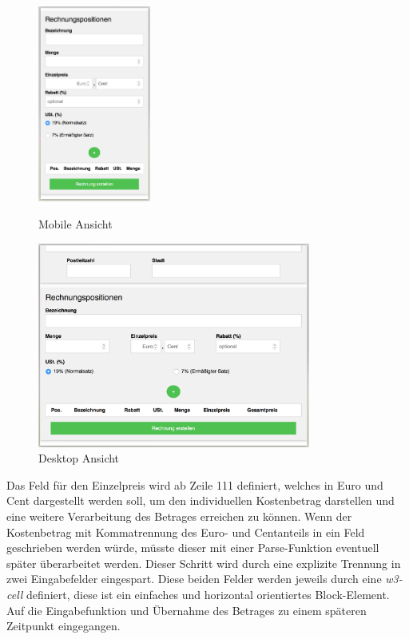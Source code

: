 \begin{figure}[H]
    \centering
    \begin{minipage}{0.45\linewidth}
        \centering
        \includegraphics[width=0.33\textwidth]{imports/smallView}
        \caption{Mobile Ansicht}
    \end{minipage}
    \begin{minipage}{0.45\linewidth}
        \centering
        \includegraphics[width=0.8\textwidth]{imports/medium+largeView}
        \caption{Desktop Ansicht}
    \end{minipage}
\end{figure}



Das Feld für den Einzelpreis wird ab Zeile 111 definiert, welches in Euro und Cent dargestellt werden soll, um den individuellen Kostenbetrag darstellen und eine weitere Verarbeitung des Betrages erreichen zu können. Wenn der Kostenbetrag mit Kommatrennung des Euro- und Centanteils in ein Feld geschrieben werden würde, müsste dieser mit einer Parse-Funktion eventuell später überarbeitet werden. Dieser Schritt wird durch eine explizite Trennung in zwei Eingabefelder eingespart. Diese beiden Felder werden jeweils durch eine \textit{w3-cell} definiert, diese ist ein einfaches und horizontal orientiertes Block-Element. 
Auf die Eingabefunktion und Übernahme des Betrages zu einem späteren Zeitpunkt eingegangen.

